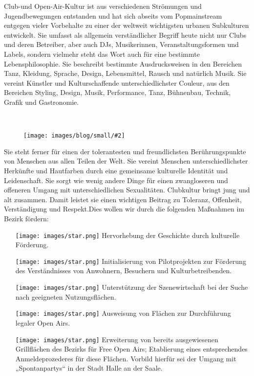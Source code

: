 \documentclass[a4paper,10pt]{article}
\newcommand{\mysection}[1]{{\vspace{1cm}\noindent\color{gray}{\ttfamily\LARGE\raggedright #1}\\\medskip}}
\newcommand{\abschnitt}[2]{%
\mysection{\raggedright #1}%
\begin{figure}[t]%
\vspace*{-2.7cm}%
\hspace*{-2.1cm}%
\texttt{[image: images/blog/small/\#2]} %
\end{figure}%
}
\begin{document}
\enlargethispage{2em}
Club-und Open-Air-Kultur ist aus verschiedenen Strömungen und
Jugendbewegungen entstanden und hat sich abseits vom Popmainstream
entgegen vieler Vorbehalte zu einer der weltweit wichtigsten urbanen
Subkulturen entwickelt. Sie umfasst als allgemein verständlicher Begriff
heute nicht nur Clubs und deren Betreiber, aber auch DJs, Musikerinnen,
Veranstaltungsformen und Labels, sondern vielmehr steht das Wort auch
für eine bestimmte Lebensphilosophie. Sie beschreibt bestimmte
Ausdrucksweisen in den Bereichen Tanz, Kleidung, Sprache, Design,
Lebensmittel, Rausch und natürlich Musik. Sie vereint Künstler und
Kulturschaffende unterschiedlichster Couleur, aus den Bereichen Styling,
Design, Musik, Performance, Tanz, Bühnenbau, Technik, Grafik und
Gastronomie.

\abschnitt{}{Deephouse.png}

Sie steht ferner für einen der tolerantesten und freundlichsten
Berührungspunkte von Menschen aus allen Teilen der Welt. Sie vereint
Menschen unterschiedlichster Herkünfte und Hautfarben durch eine
gemeinsame kulturelle Identität und Leidenschaft. Sie sorgt wie wenig
andere Dinge für einen zwangloseren und offeneren Umgang mit
unterschiedlichen Sexualitäten. Clubkultur bringt jung und alt zusammen.
Damit leistet sie einen wichtigen Beitrag zu Toleranz, Offenheit,
Verständigung und Respekt.Dies wollen wir durch die folgenden Maßnahmen
im Bezirk fördern:

\begin{itemize}
\itemsep1pt\parskip0pt
\item[\texttt{[image: images/star.png]}]
  Hervorhebung der Geschichte durch kulturelle Förderung.
\item[\texttt{[image: images/star.png]}]
  Initialisierung von Pilotprojekten zur Förderung des Verständnisses
  von Anwohnern, Besuchern und Kulturbetreibenden.
\item[\texttt{[image: images/star.png]}]
  Unterstützung der Szenewirtschaft bei der Suche nach geeigneten
  Nutzungsflächen.
\item[\texttt{[image: images/star.png]}]
  Ausweisung von Flächen zur Durchführung legaler Open Airs.
\item[\texttt{[image: images/star.png]}]
  Erweiterung von bereits ausgewiesenen Grillflächen des Bezirks für
  Free Open Airs; Etablierung eines entsprechendes Anmeldeprozederes für
  diese Flächen. Vorbild hierfür sei der Umgang mit „Spontanpartys`` in
  der Stadt Halle an der Saale.
\end{itemize}
\end{document}
